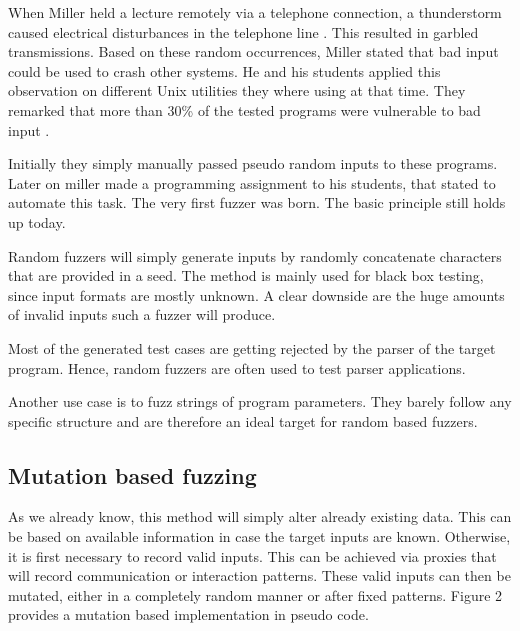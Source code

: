 \documentclass[journal=tosc,final]{iacrtrans}
\begin{document}
When Miller held a lecture remotely via a telephone connection, a thunderstorm caused electrical disturbances in the telephone line . This resulted in garbled transmissions. Based on these random occurrences, Miller stated that bad input  could be used to crash other systems. He and his students applied this observation on different Unix utilities they where using at that time. They remarked that  more than 30\% of the tested programs were vulnerable to bad input \cite{fuzz}. 

Initially they simply manually passed pseudo random inputs to these programs. Later on miller made a programming assignment to his students, that stated to automate this task. The very first fuzzer was born. The basic principle still holds up today. 

Random fuzzers will simply generate inputs by randomly concatenate characters that are provided in a seed. The method is mainly used for black box testing, since input formats are mostly unknown. A clear downside are the huge amounts of invalid inputs such a fuzzer will produce. 

Most of the generated test cases are getting rejected by the parser of the target program. Hence, random fuzzers are often used to test parser applications.

Another use case is to fuzz strings of program parameters. They barely follow any specific structure and are therefore an ideal target for random based fuzzers. 
\subsection{Mutation based fuzzing}
As we already know, this method will simply alter already existing data. This can be based on available information in case the target inputs are known. Otherwise, it is first necessary to record valid inputs. This can be achieved via proxies that will record communication or interaction patterns. These valid inputs can then be mutated, either in a completely random manner or after fixed patterns. Figure 2 provides a mutation based implementation in pseudo code. 
\end{document}
